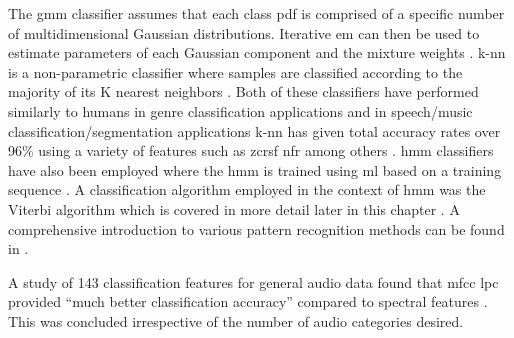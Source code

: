 The \DIFdelbegin {}\DIFdelend \DIFaddbegin \gls{gmm} \DIFaddend classifier assumes that each class pdf is comprised of a specific number of multidimensional Gaussian distributions. Iterative \DIFdelbegin {}\DIFdelend \DIFaddbegin \gls{em} \DIFaddend can then be used to estimate parameters of \DIFdelbegin {}\DIFdelend each Gaussian component and the mixture weights \cite{Tzanetakis2002}. \DIFdelbegin {}\DIFdelend \DIFaddbegin \gls{k-nn} \DIFaddend is a non-parametric classifier where samples are classified according to the majority of its K nearest neighbors \cite{Lu2001}. Both of these classifiers have performed similarly to humans in genre classification applications \cite{Tzanetakis2002} and in speech/music classification/segmentation applications \DIFdelbegin {}\DIFdelend \DIFaddbegin \gls{k-nn} \DIFaddend has given total accuracy rates over 96\% using a variety of features such as \DIFdelbegin {}\DIFdelend \DIFaddbegin \gls{zcr}\DIFadd{, }\gls{sf} \gls{nfr} \DIFaddend among others \cite{Lu2002}. \DIFdelbegin {}\DIFdelend \DIFaddbegin \gls{hmm} \DIFaddend classifiers have also been employed where the \DIFdelbegin {}\DIFdelend \DIFaddbegin \gls{hmm} \DIFaddend is trained using \DIFdelbegin {}\DIFdelend \DIFaddbegin \gls{ml} \DIFaddend based on a training sequence \cite{Kimber1997}\cite{Xiong2003}\cite{Burke2013}. A classification algorithm employed in the context of \DIFdelbegin {}\DIFdelend \DIFaddbegin \gls{hmm} \DIFaddend was the Viterbi algorithm which is covered in more detail later in this chapter \cite{Kimber1997}\cite{Burke2013}.
A comprehensive introduction to various pattern recognition methods can be found in \cite{Duda2001}.

A study of 143 classification features for general audio data found that \DIFdelbegin {}\DIFdelend \DIFaddbegin \gls{mfcc} \gls{lpc} \DIFaddend provided ``much better classification accuracy'' compared to spectral features \cite{Li2001}. This was concluded irrespective of the number of audio categories desired.

